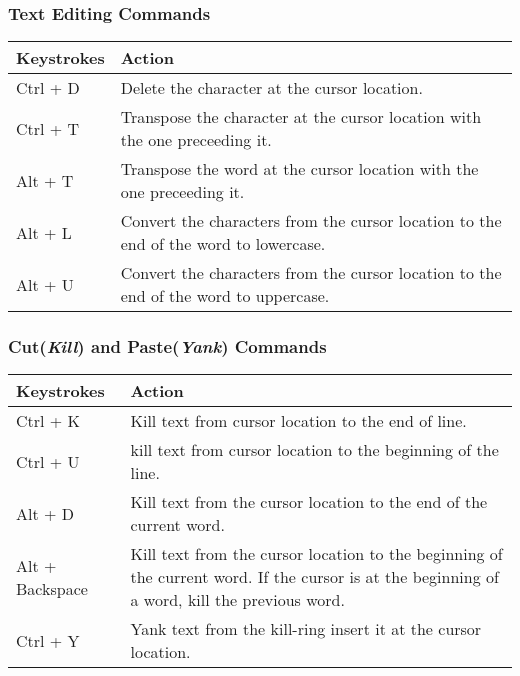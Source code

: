 \documentclass[12pt]{article}
\begin{document}
\subsubsection{Text Editing Commands}%
\begin{tabular}{|l|p{5in}|}
	\hline
	Keystrokes & Action\\ \hline
	Ctrl + D & Delete the character at the cursor location.\\
	Ctrl + T & Transpose the character at the cursor location with the one preceeding it.\\
	Alt + T  &  Transpose the word at the cursor location with the one preceeding it.\\
	Alt + L  &  Convert the characters from the cursor location to the end of the word to lowercase.\\
	Alt + U  & Convert the characters from the cursor location to the end of the word to uppercase.\\
	\hline
\end{tabular}


\subsubsection{Cut(\textit{Kill}) and Paste(\textit{Yank}) Commands}%
\begin{tabular}{|l|p{5in}|}
	\hline
	Keystrokes & Action\\ \hline
	Ctrl + K & Kill text from cursor location to the end of line.\\
	Ctrl + U & kill text from cursor location to the beginning of the line.\\
	Alt + D  & Kill text from the cursor location to the end of the current word.\\
	Alt + Backspace  & Kill text from the cursor location to the beginning of the current word. If the cursor is at the beginning of a word, kill the previous word.\\
	Ctrl + Y & Yank text from the kill-ring insert it at the cursor location.\\
	\hline
\end{tabular}
\end{document}
